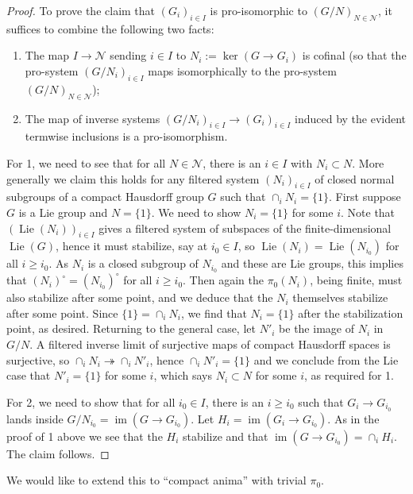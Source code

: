\documentclass[12pt]{article}
\theoremstyle{definition}
\newcommand{\on}{\operatorname}
\newcommand{\mc}{\mathcal}
\begin{document}
\begin{proof}
To prove the claim that $(G_i)_{i\in I}$ is pro-isomorphic to $(G/N)_{N\in\mc{N}}$, it suffices to combine the following two facts:
\begin{enumerate}
\item The map $I\to \mc{N}$ sending $i\in I$ to $N_i:=\on{ker}(G\to G_i)$ is cofinal (so that the pro-system $(G/N_i)_{i\in I}$ maps isomorphically to the pro-system $(G/N)_{N\in\mc{N}}$);
\item The map of inverse systems $(G/N_i)_{i\in I} \to (G_i)_{i\in I}$ induced by the evident termwise inclusions is a pro-isomorphism.
\end{enumerate}
For 1, we need to see that for all $N\in\mc{N}$, there is an $i\in I$ with $N_i\subset N$.  More generally we claim this holds for any filtered system $(N_i)_{i\in I}$ of closed normal subgroups of a compact Hausdorff group $G$ such that $\cap_i N_i=\{1\}$.  First suppose $G$ is a Lie group and $N=\{1\}$.  We need to show $N_i=\{1\}$ for some $i$.  Note that $(\on{Lie}(N_i))_{i\in I}$ gives a filtered system of subspaces of the finite-dimensional $\on{Lie}(G)$, hence it must stabilize, say at $i_0\in I$, so $\on{Lie}(N_i)=\on{Lie}(N_{i_0})$ for all $i\geq i_0$.  As $N_i$ is a closed subgroup of $N_{i_0}$ and these are Lie groups, this implies that $(N_i)^\circ=(N_{i_0})^\circ$ for all $i\geq i_0$.  Then again the $\pi_0(N_i)$, being finite, must also stabilize after some point, and we deduce that the $N_i$ themselves stabilize after some point.  Since $\{1\}=\cap_i N_i$, we find that $N_i=\{1\}$ after the stabilization point, as desired.  Returning to the general case, let $N'_i$ be the image of $N_i$ in $G/N$.  A filtered inverse limit of surjective maps of compact Hausdorff spaces is surjective, so $\cap_i N_i\twoheadrightarrow \cap_i N'_i$, hence $\cap_i N'_i=\{1\}$ and we conclude from the Lie case that $N'_i=\{1\}$ for some $i$, which says $N_i\subset N$ for some $i$, as required for 1.

For 2, we need to show that for all $i_0\in I$, there is an $i\geq i_0$ such that $G_i\to G_{i_0}$ lands inside $G/N_{i_0} = \on{im}(G\to G_{i_0})$.  Let $H_i=\on{im}(G_i\to G_{i_0})$.  As in the proof of 1 above we see that the $H_i$ stabilize and that $\on{im}(G\to G_{i_0})=\cap_i H_i$.  The claim follows.
\end{proof}

We would like to extend this to ``compact anima'' with trivial $\pi_0$.
\end{document}
